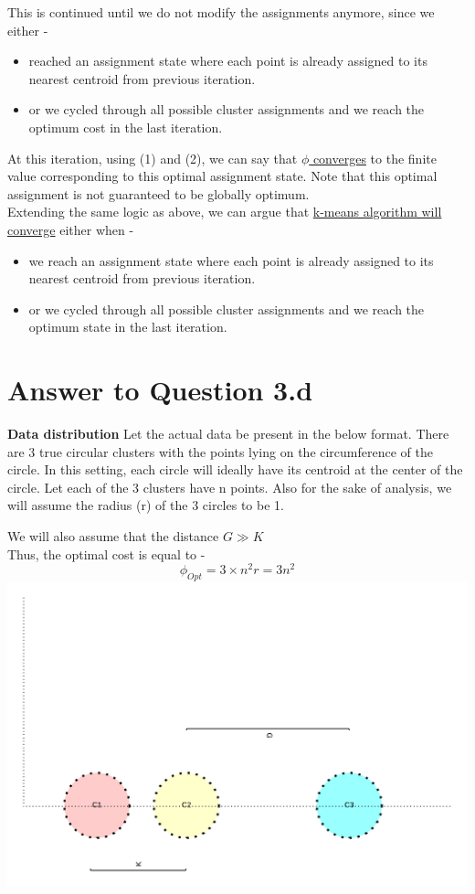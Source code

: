 \documentclass[11pt]{article}
\begin{document}
{This is continued until we do not modify the assignments anymore, since we either -
\begin{itemize}
\item reached an assignment state where each point is already assigned to its nearest centroid from previous iteration.
\item or we cycled through all possible cluster assignments and we reach the optimum cost in the last iteration.
\end{itemize}

At this iteration, using (1) and (2), we can say that \underline{$\phi$ converges} to the finite value corresponding to this optimal assignment state. Note that this optimal assignment is not guaranteed to be globally optimum.\\

Extending the same logic as above, we can argue that \underline{k-means algorithm will converge} either when -
\begin{itemize}
\item we reach an assignment state where each point is already assigned to its nearest centroid from previous iteration.
\item or we cycled through all possible cluster assignments and we reach the optimum state in the last iteration.
\end{itemize}

\pagebreak[4]
\section*{Answer to Question 3.d}

\textbf{Data distribution}
Let the actual data be present in the below format. There are 3 true circular clusters with the points lying on the circumference of the circle. In this setting, each circle will ideally have its centroid at the center of the circle. Let each of the 3 clusters have n points. Also for the sake of analysis, we will assume the radius (r) of the 3 circles to be 1.

We will also assume that the distance $G \gg K$
\\

Thus, the optimal cost is equal to -
$$\phi_{Opt} = 3 \times n^2 r = 3n^2$$
\includegraphics[scale=0.8]{q3_1} \\

}
\end{document}
